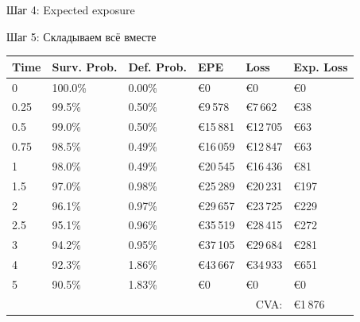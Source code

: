 \documentclass{beamer}
\begin{document}
\begin{frame}{Шаг 4: Expected exposure}
\begin{figure}
\centering
\end{figure}
\end{frame}



\begin{frame}{Шаг 5: Складываем всё вместе}
\begin{tabular}{l|l|l|l|l|l}
Time & Surv. Prob. & Def. Prob. & EPE & Loss & Exp. Loss \\
 \hline
0		& 100.0\%	& 0.00\%	& \euro0		& \euro0		& \euro0 \\
0.25	& 99.5\%	& 0.50\%	& \euro9\,578	& \euro7\,662	& \euro38 \\
0.5		& 99.0\%	& 0.50\%	& \euro15\,881	& \euro12\,705	& \euro63 \\
0.75	& 98.5\%	& 0.49\%	& \euro16\,059	& \euro12\,847	& \euro63 \\
1		& 98.0\%	& 0.49\%	& \euro20\,545	& \euro16\,436	& \euro81 \\
1.5		& 97.0\%	& 0.98\%	& \euro25\,289	& \euro20\,231	& \euro197 \\
2		& 96.1\%	& 0.97\%	& \euro29\,657	& \euro23\,725	& \euro229 \\
2.5		& 95.1\%	& 0.96\%	& \euro35\,519	& \euro28\,415	& \euro272 \\
3		& 94.2\%	& 0.95\%	& \euro37\,105	& \euro29\,684	& \euro281 \\
4		& 92.3\%	& 1.86\%	& \euro43\,667	& \euro34\,933	& \euro651 \\
5		& 90.5\%	& 1.83\%	& \euro0		& \euro0		& \euro0 \\
\hline
\multicolumn{5}{r}{CVA:} & \euro1\,876
\end{tabular}
\end{frame}
\end{document}

